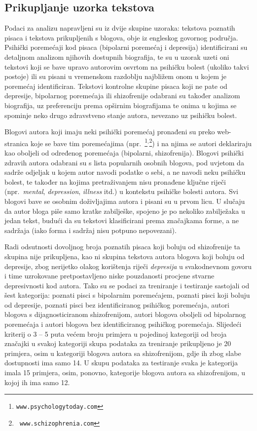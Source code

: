 \documentclass[10pt, a4paper]{article}
\begin{document}
\subsection{Prikupljanje uzorka tekstova}
Podaci za analizu napravljeni su iz dvije skupine uzoraka: tekstova poznatih pisaca i tekstova prikupljenih s blogova, obje iz engleskog govornog područja. Psihički poremećaji kod pisaca (bipolarni poremećaj i depresija) identificirani su detaljnom analizom njihovih dostupnih biografija, te su u uzorak uzeti oni tekstovi koji se bave upravo autorovim osvrtom na psihičku bolest (ukoliko takvi postoje) ili su pisani u vremenskom razdoblju najbližem onom u kojem je poremećaj identificiran. Tekstovi kontrolne skupine pisaca koji ne pate od depresije, bipolarnog poremećaja ili shizofrenije odabrani su također analizom biografija, uz preferenciju prema opširnim biografijama te onima u kojima se spominje neko drugo zdravstveno stanje autora, nevezano uz psihičku bolest.

Blogovi autora koji imaju neki psihički poremećaj pronađeni su preko web-stranica koje se bave tim poremećajima (npr.~\footnote{\texttt{www.psychologytoday.com}}$^,$\footnote{\texttt{ www.schizophrenia.com}}) i na njima se autori deklariraju kao oboljeli od određenog poremećaja (bipolarni, shizofrenija). Blogovi psihički zdravih autora odabrani su s lista popularnih osobnih blogova, pod uvjetom da sadrže odjeljak u kojem autor navodi podatke o sebi, a ne navodi neku psihičku bolest, te također na kojima pretraživanjem nisu pronađene ključne riječi (npr.~\emph{mental}, \emph{depression}, \emph{illness} itd.) u kontekstu psihičke bolesti autora. Svi blogovi bave se osobnim doživljajima autora i pisani su u prvom licu. U slučaju da autor bloga piše samo kratke zabilješke, spojeno je po nekoliko zabilježaka u jedan tekst, budući da su tekstovi klasificirani prema značajkama forme, a ne sadržaja (iako forma i sadržaj nisu potpuno nepovezani).

Radi odsutnosti dovoljnog broja poznatih pisaca koji boluju od shizofrenije ta skupina nije prikupljena, kao ni skupina tekstova autora blogova koji boluju od depresije, zbog nerijetko olakog korištenja riječi \emph{depresija} u svakodnevnom govoru i time uzrokovane pretpostavljeno niske pouzdanosti procjene stvarne depresivnosti kod autora. Tako su se podaci za treniranje i testiranje sastojali od šest kategorija: poznati pisci s bipolarnim poremećajem, poznati pisci koji boluju od depresije, poznati pisci bez identificiranog psihičkog poremećaja, autori blogova s dijagnosticiranom shizofrenijom, autori blogova oboljeli od bipolarnog poremećaja i autori blogova bez identificiranog psihičkog poremećaja. Slijedeći kriterij o 3 -- 5 puta većem broju primjera u pojedinoj kategoriji od broja značajki \citep{ribaric} u svakoj kategoriji skupa podataka za treniranje prikupljeno je 20 primjera, osim u kategoriji blogova autora sa shizofrenijom, gdje ih zbog slabe dostupnosti ima samo 14. U skupu podataka za testiranje svaka je kategorija imala 15 primjera, osim, ponovno, kategorije blogova autora sa shizofrenijom, u kojoj ih ima samo 12. 
\end{document}
